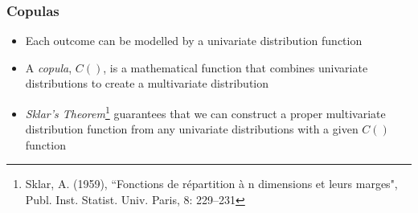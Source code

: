 \documentclass{beamer}
\begin{document}
	\begin{frame}
		\frametitle{Copulas}
		\begin{itemize}
			\setlength\itemsep{2em}
			\item Each outcome can be modelled by a univariate distribution function
			\item A \emph{copula}, $C()$, is a mathematical function that combines univariate distributions to create a multivariate distribution
			\item \emph{Sklar's Theorem}\footnote{Sklar, A. (1959), ``Fonctions de  r\'epartition \`a n dimensions et leurs marges", Publ. Inst. Statist. Univ. Paris, 8: 229–231} guarantees that we can construct a proper multivariate distribution function from any univariate distributions with a given $C()$ function
		\end{itemize}
	\end{frame}
	
\end{document}

